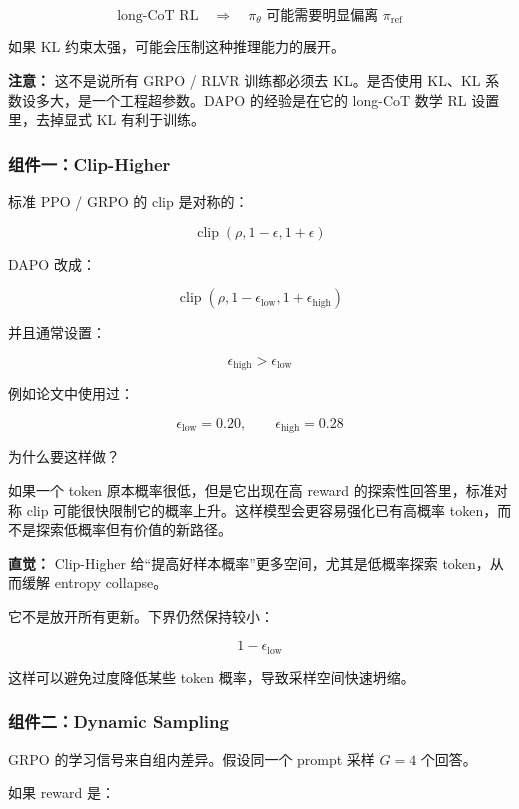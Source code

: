 \[
\text{long-CoT RL}
\quad
\Rightarrow
\quad
\pi_\theta \text{ 可能需要明显偏离 } \pi_\text{ref}
\]

如果 KL 约束太强，可能会压制这种推理能力的展开。

\begin{warnbox}
\textbf{注意：} 这不是说所有 GRPO / RLVR 训练都必须去 KL。是否使用 KL、KL 系数设多大，是一个工程超参数。DAPO 的经验是在它的 long-CoT 数学 RL 设置里，去掉显式 KL 有利于训练。
\end{warnbox}

\subsubsection{组件一：Clip-Higher}

标准 PPO / GRPO 的 clip 是对称的：

\[
\operatorname{clip}(\rho,1-\epsilon,1+\epsilon)
\]

DAPO 改成：

\[
\operatorname{clip}
(\rho,1-\epsilon_\text{low},1+\epsilon_\text{high})
\]

并且通常设置：

\[
\epsilon_\text{high} > \epsilon_\text{low}
\]

例如论文中使用过：

\[
\epsilon_\text{low}=0.20,
\qquad
\epsilon_\text{high}=0.28
\]

为什么要这样做？

如果一个 token 原本概率很低，但是它出现在高 reward 的探索性回答里，标准对称 clip 可能很快限制它的概率上升。这样模型会更容易强化已有高概率 token，而不是探索低概率但有价值的新路径。

\begin{intubox}
\textbf{直觉：} Clip-Higher 给“提高好样本概率”更多空间，尤其是低概率探索 token，从而缓解 entropy collapse。
\end{intubox}

它不是放开所有更新。下界仍然保持较小：

\[
1-\epsilon_\text{low}
\]

这样可以避免过度降低某些 token 概率，导致采样空间快速坍缩。

\subsubsection{组件二：Dynamic Sampling}

GRPO 的学习信号来自组内差异。假设同一个 prompt 采样 $G=4$ 个回答。

如果 reward 是：

